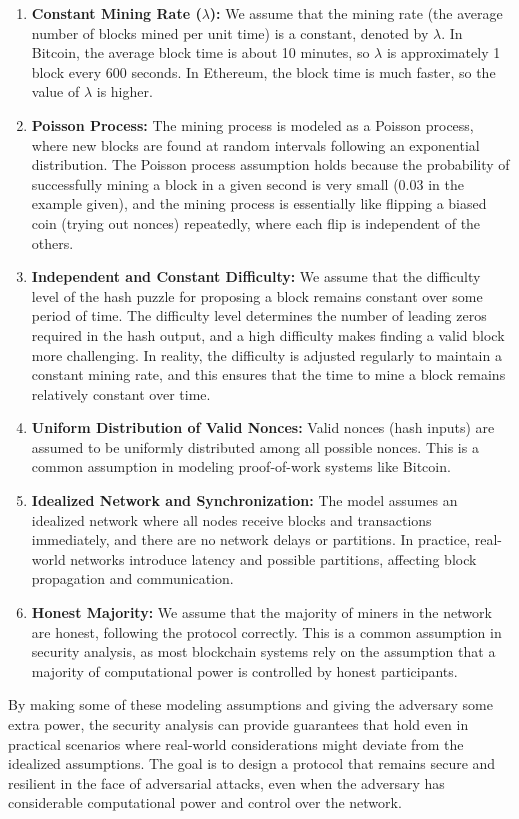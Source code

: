 \documentclass{report}
\begin{document}
\begin{enumerate}
	\item \textbf{Constant Mining Rate ($\lambda$):} We assume that the mining rate (the average number of blocks mined per unit time) is a constant, denoted by $\lambda$. In Bitcoin, the average block time is about 10 minutes, so $\lambda$ is approximately 1 block every 600 seconds. In Ethereum, the block time is much faster, so the value of $\lambda$ is higher.
	\item \textbf{Poisson Process:} The mining process is modeled as a Poisson process, where new blocks are found at random intervals following an exponential distribution. The Poisson process assumption holds because the probability of successfully mining a block in a given second is very small (0.03 in the example given), and the mining process is essentially like flipping a biased coin (trying out nonces) repeatedly, where each flip is independent of the others.
	\item \textbf{Independent and Constant Difficulty:} We assume that the difficulty level of the hash puzzle for proposing a block remains constant over some period of time. The difficulty level determines the number of leading zeros required in the hash output, and a high difficulty makes finding a valid block more challenging. In reality, the difficulty is adjusted regularly to maintain a constant mining rate, and this ensures that the time to mine a block remains relatively constant over time.
	\item \textbf{Uniform Distribution of Valid Nonces:} Valid nonces (hash inputs) are assumed to be uniformly distributed among all possible nonces. This is a common assumption in modeling proof-of-work systems like Bitcoin.
	\item \textbf{Idealized Network and Synchronization:} The model assumes an idealized network where all nodes receive blocks and transactions immediately, and there are no network delays or partitions. In practice, real-world networks introduce latency and possible partitions, affecting block propagation and communication.
	\item \textbf{Honest Majority:}  We assume that the majority of miners in the network are honest, following the protocol correctly. This is a common assumption in security analysis, as most blockchain systems rely on the assumption that a majority of computational power is controlled by honest participants.
\end{enumerate}
By making some of these modeling assumptions and giving the adversary some extra power, the security analysis can provide guarantees that hold even in practical scenarios where real-world considerations might deviate from the idealized assumptions. The goal is to design a protocol that remains secure and resilient in the face of adversarial attacks, even when the adversary has considerable computational power and control over the network.
\end{document}
